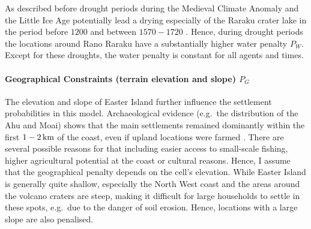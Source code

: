 As described before drought periods during the Medieval Climate Anomaly and the Little Ice Age potentially lead a drying especially of the Raraku crater lake in the period before $1200$ and between $1570-1720$ \citep{Rull2020}. 
Hence, during drought periods the locations around Rano Raraku have a substantially higher water penalty $P_W$.
Except for these droughts, the water penalty is constant for all agents and times.

\paragraph{Geographical Constraints (terrain elevation and slope) $P_G$}
The elevation and slope of Easter Island further influence the settlement probabilities in this model.
Archaeological evidence (e.g.\ the distribution of the Ahu and Moai) shows that the main settlements remained dominantly within the first $1-2\, \rm{km}$ of the coast, even if upland locations were farmed \citep{Bahn2017}.
There are several possible reasons for that including easier access to small-scale fishing, higher agricultural potential at the coast or cultural reasons.
Hence, I assume that the geographical penalty depends on the cell's elevation.
While Easter Island is generally quite shallow, especially the North West coast and the areas around the volcano craters are steep, making it difficult for large households to settle in these spots, e.g.\ due to the danger of soil erosion. 
Hence, locations with a large slope are also penalised.
